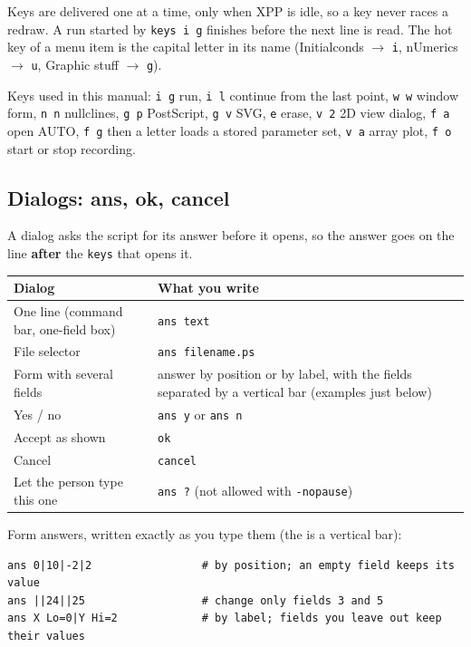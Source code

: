 \documentclass{article}
\begin{document}
Keys are delivered one at a time, only when XPP is idle, so a key
never races a redraw. A run started by \texttt{keys\ i\ g} finishes
before the next line is read. The hot key of a menu item is the capital
letter in its name (Initialconds $\rightarrow$ \texttt{i}, nUmerics $\rightarrow$
\texttt{u}, Graphic stuff $\rightarrow$ \texttt{g}).

Keys used in this manual: \texttt{i\ g} run, \texttt{i\ l}
continue from the last point, \texttt{w\ w} window form,
\texttt{n\ n} nullclines, \texttt{g\ p} PostScript,
\texttt{g\ v} SVG, \texttt{e} erase, \texttt{v\ 2} 2D view
dialog, \texttt{f\ a} open AUTO, \texttt{f\ g} then a letter loads
a stored parameter set, \texttt{v\ a} array plot, \texttt{f\ o}
start or stop recording.

\subsection{Dialogs: ans, ok, cancel}\label{scr:4}

A dialog asks the script for its answer before it opens, so the
answer goes on the line \textbf{after} the \texttt{keys}
that opens it.

\begin{longtable}[]{@{}p{}p{}@{}}
\toprule\noalign{}
Dialog & What you write \\
\midrule\noalign{}
\endhead
\bottomrule\noalign{}
\endlastfoot
One line (command bar, one-field box) & \texttt{ans\ text} \\
File selector & \texttt{ans\ filename.ps} \\
Form with several fields & answer by position or by label, with the fields separated by a
vertical bar (examples just below) \\
Yes / no & \texttt{ans\ y} or \texttt{ans\ n} \\
Accept as shown & \texttt{ok} \\
Cancel & \texttt{cancel} \\
Let the person type this one & \texttt{ans\ ?} (not allowed with \texttt{-nopause}) \\
\end{longtable}

Form answers, written exactly as you type them (the \texttt{\textbar{}} is
a vertical bar):

{\small\begin{verbatim}
ans 0|10|-2|2                 # by position; an empty field keeps its value
ans ||24||25                  # change only fields 3 and 5
ans X Lo=0|Y Hi=2             # by label; fields you leave out keep their values
\end{verbatim}}
\end{document}
